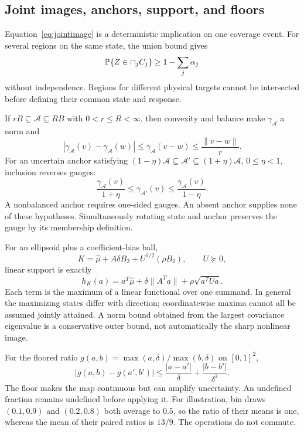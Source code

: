 \subsection{Joint images, anchors, support, and floors}

Equation~\eqref{eq:jointimage} is a deterministic implication on one coverage event. For several regions on the same state, the union bound gives
\begin{equation}
 \mathbb P\{Z\in\cap_j C_j\}\geq1-\sum_j\alpha_j
\end{equation}
without independence. Regions for different physical targets cannot be intersected before defining their common state and response.

If $rB\subseteq\mathcal A\subseteq RB$ with $0<r\leq R<\infty$, then convexity and balance make $\gamma_{\mathcal A}$ a norm and
\begin{equation}
 |\gamma_{\mathcal A}(v)-\gamma_{\mathcal A}(w)|
 \leq\gamma_{\mathcal A}(v-w)\leq\frac{\|v-w\|}{r}.
\end{equation}
For an uncertain anchor satisfying $(1-\eta)\mathcal A\subseteq\mathcal A'\subseteq(1+\eta)\mathcal A$, $0\leq\eta<1$, inclusion reverses gauges:
\begin{equation}
 \frac{\gamma_{\mathcal A}(v)}{1+\eta}
 \leq\gamma_{\mathcal A'}(v)
 \leq\frac{\gamma_{\mathcal A}(v)}{1-\eta}.
\end{equation}
A nonbalanced anchor requires one-sided gauges. An absent anchor supplies none of these hypotheses. Simultaneously rotating state and anchor preserves the gauge by its membership definition.

For an ellipsoid plus a coefficient-bias ball,
\begin{equation}
 K=\hat\mu+A\delta B_2+U^{1/2}(\rho B_2),\qquad U\succeq0,
\end{equation}
linear support is exactly
\begin{equation}
 h_K(a)=a^T\hat\mu+\delta\|A^Ta\|+\rho\sqrt{a^TUa}.
 \label{eq:support}
\end{equation}
Each term is the maximum of a linear functional over one summand. In general the maximizing states differ with direction; coordinatewise maxima cannot all be assumed jointly attained. A norm bound obtained from the largest covariance eigenvalue is a conservative outer bound, not automatically the sharp nonlinear image.

For the floored ratio $g(a,b)=\max(a,\delta)/\max(b,\delta)$ on $[0,1]^2$,
\begin{equation}
 |g(a,b)-g(a',b')|
 \leq\frac{|a-a'|}{\delta}+\frac{|b-b'|}{\delta^2}.
\end{equation}
The floor makes the map continuous but can amplify uncertainty. An undefined fraction remains undefined before applying it. For illustration, bin draws $(0.1,0.9)$ and $(0.2,0.8)$ both average to $0.5$, so the ratio of their means is one, whereas the mean of their paired ratios is $13/9$. The operations do not commute.

